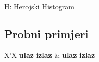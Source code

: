 \begin{statement}[
  timelimit=1 s,
  memorylimit=512 MiB,
]{H: Herojski Histogram}
\subsection*{Probni primjeri}
\begin{tabularx}{\textwidth}{X'X}
  \textbf{ulaz}
  \linespread{1}{}
  \textbf{izlaz}
  \linespread{1}{} &
  \textbf{ulaz}
  \linespread{1}{}
  \textbf{izlaz}
  \linespread{1}{}
\end{tabularx}

\end{statement}

